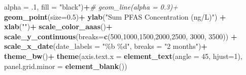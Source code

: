 \documentclass[
]{article}
\newenvironment{Shaded}{\begin{snugshade}}{\end{snugshade}}
\newcommand{\AttributeTok}[1]{\textcolor[rgb]{0.13,0.29,0.53}{#1}}
\newcommand{\CommentTok}[1]{\textcolor[rgb]{0.56,0.35,0.01}{\textit{#1}}}
\newcommand{\DecValTok}[1]{\textcolor[rgb]{0.00,0.00,0.81}{#1}}
\newcommand{\FloatTok}[1]{\textcolor[rgb]{0.00,0.00,0.81}{#1}}
\newcommand{\FunctionTok}[1]{\textcolor[rgb]{0.13,0.29,0.53}{\textbf{#1}}}
\newcommand{\NormalTok}[1]{#1}
\newcommand{\SpecialCharTok}[1]{\textcolor[rgb]{0.81,0.36,0.00}{\textbf{#1}}}
\newcommand{\StringTok}[1]{\textcolor[rgb]{0.31,0.60,0.02}{#1}}
\begin{document}
\begin{Shaded}
\begin{Highlighting}[]
             \AttributeTok{alpha =}\NormalTok{ .}\DecValTok{1}\NormalTok{, }\AttributeTok{fill =} \StringTok{"black"}\NormalTok{)}\SpecialCharTok{+}\CommentTok{\# geom\_line(alpha = 0.3)+}
    \FunctionTok{geom\_point}\NormalTok{(}\AttributeTok{size=}\FloatTok{0.5}\NormalTok{)}\SpecialCharTok{+}
    \FunctionTok{ylab}\NormalTok{(}\StringTok{"Sum PFAS Concentration (ng/L)"}\NormalTok{) }\SpecialCharTok{+}
    \FunctionTok{xlab}\NormalTok{(}\StringTok{""}\NormalTok{)}\SpecialCharTok{+}
    \FunctionTok{scale\_color\_aaas}\NormalTok{()}\SpecialCharTok{+}
    \FunctionTok{scale\_y\_continuous}\NormalTok{(}\AttributeTok{breaks=}\FunctionTok{c}\NormalTok{(}\DecValTok{500}\NormalTok{,}\DecValTok{1000}\NormalTok{,}\DecValTok{1500}\NormalTok{,}\DecValTok{2000}\NormalTok{,}\DecValTok{2500}\NormalTok{, }\DecValTok{3000}\NormalTok{, }\DecValTok{3500}\NormalTok{)) }\SpecialCharTok{+}
    \FunctionTok{scale\_x\_date}\NormalTok{(}\AttributeTok{date\_labels =} \StringTok{"\%b \%d"}\NormalTok{, }\AttributeTok{breaks =} \StringTok{"2 months"}\NormalTok{)}\SpecialCharTok{+}
    \FunctionTok{theme\_bw}\NormalTok{()}\SpecialCharTok{+}
    \FunctionTok{theme}\NormalTok{(}\AttributeTok{axis.text.x =} \FunctionTok{element\_text}\NormalTok{(}\AttributeTok{angle =} \DecValTok{45}\NormalTok{, }\AttributeTok{hjust=}\DecValTok{1}\NormalTok{),}
          \AttributeTok{panel.grid.minor =} \FunctionTok{element\_blank}\NormalTok{())}


\end{Highlighting}
\end{Shaded}
\end{document}
